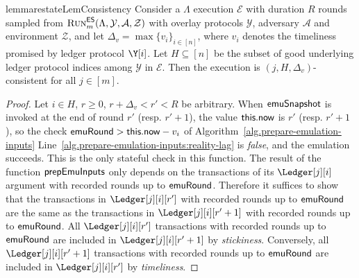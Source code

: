 \begin{restatable}[Consistency]{lemma}{restateLemConsistency}\label{lem:consistency}
  Consider a \rollerblade $\Lambda$ execution $\mathcal{E}$ with duration $R$ rounds
  sampled from $\textsc{Run}^{\textsf{ES}}_m(\Lambda, \mathcal{Y}, \mathcal{A}, \mathcal{Z})$
  with overlay protocols $\mathcal{Y}$, adversary $\mathcal{A}$ and environment $\mathcal{Z}$,
  and let $\Delta_v = \max\{v_i\}_{i \in [n]}$,
  where $v_i$ denotes the timeliness
  promised by ledger protocol $\Y[i]$.
  Let $H \subseteq [n]$ be the subset of good underlying ledger protocol indices among $\mathcal{Y}$
  in $\mathcal{E}$.
  Then the execution is $(j, H, \Delta_v)$-consistent for all $j \in [m]$.
\end{restatable}
\begin{proof}
  Let $i \in H$, $r \geq 0$, $r + \Delta_v < r' < R$ be arbitrary.
  When $\textsf{emuSnapshot}$ is invoked at the end of round $r'$ (resp. $r' + 1$),
  the value $\textsf{this}.\textsf{now}$
  is $r'$ (resp. $r' + 1$), so the check $\textsf{emuRound} > \textsf{this}.\textsf{now} - v_i$ of Algorithm~\ref{alg.prepare-emulation-inputs}
  Line~\ref{alg.prepare-emulation-inputs:reality-lag} is \emph{false}, and the emulation
  succeeds. This is the only stateful check in this function.
  The result of the function $\textsf{prepEmuInputs}$ only depends on the transactions of
  its $\Ledger[j][i]$ argument with recorded rounds up to $\textsf{emuRound}$.
  Therefore it suffices to show that the transactions in
  $\Ledger[j][i][r']$ with recorded rounds up to $\textsf{emuRound}$ are the same
  as the transactions in $\Ledger[j][i][r' + 1]$ with recorded rounds up to $\textsf{emuRound}$.
  All $\Ledger[j][i][r']$ transactions with recorded rounds up to $\textsf{emuRound}$
  are included in $\Ledger[j][i][r' + 1]$ by \emph{stickiness}.
  Conversely, all $\Ledger[j][i][r' + 1]$ transactions with recorded rounds up to $\textsf{emuRound}$
  are included in $\Ledger[j][i][r']$ by \emph{timeliness}.\Qed
\end{proof}

